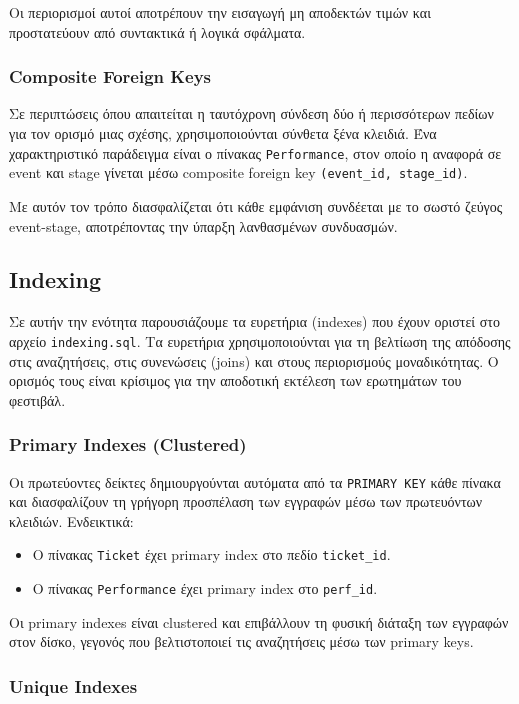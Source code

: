 \documentclass[13pt]{extarticle}
\begin{document}
Οι περιορισμοί αυτοί αποτρέπουν την εισαγωγή μη αποδεκτών τιμών και προστατεύουν από συντακτικά ή λογικά σφάλματα.

\subsubsection{Composite Foreign Keys}

Σε περιπτώσεις όπου απαιτείται η ταυτόχρονη σύνδεση δύο ή περισσότερων πεδίων για τον ορισμό μιας σχέσης, χρησιμοποιούνται σύνθετα ξένα κλειδιά. Ένα χαρακτηριστικό παράδειγμα είναι ο πίνακας \texttt{Performance}, στον οποίο η αναφορά σε event και stage γίνεται μέσω composite foreign key \texttt{(event\_id, stage\_id)}.

Με αυτόν τον τρόπο διασφαλίζεται ότι κάθε εμφάνιση συνδέεται με το σωστό ζεύγος event-stage, αποτρέποντας την ύπαρξη λανθασμένων συνδυασμών.

\subsection{Indexing}

Σε αυτήν την ενότητα παρουσιάζουμε τα ευρετήρια (indexes) που έχουν οριστεί στο αρχείο \texttt{indexing.sql}. Τα ευρετήρια χρησιμοποιούνται για τη βελτίωση της απόδοσης στις αναζητήσεις, στις συνενώσεις (joins) και στους περιορισμούς μοναδικότητας. Ο ορισμός τους είναι κρίσιμος για την αποδοτική εκτέλεση των ερωτημάτων του φεστιβάλ.

\subsubsection{Primary Indexes (Clustered)}

Οι πρωτεύοντες δείκτες δημιουργούνται αυτόματα από τα \texttt{PRIMARY KEY} κάθε πίνακα και διασφαλίζουν τη γρήγορη προσπέλαση των εγγραφών μέσω των πρωτευόντων κλειδιών. Ενδεικτικά:
\begin{itemize}
    \item Ο πίνακας \texttt{Ticket} έχει primary index στο πεδίο \texttt{ticket\_id}.
    \item Ο πίνακας \texttt{Performance} έχει primary index στο \texttt{perf\_id}.
\end{itemize}
Οι primary indexes είναι clustered και επιβάλλουν τη φυσική διάταξη των εγγραφών στον δίσκο, γεγονός που βελτιστοποιεί τις αναζητήσεις μέσω των primary keys.

\subsubsection{Unique Indexes}
\end{document}

